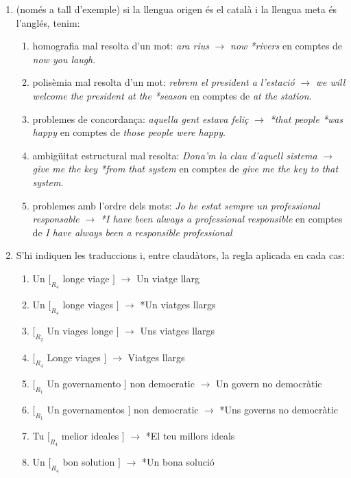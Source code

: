 \begin{enumerate}
\item (només a tall d'exemple) si la llengua origen és el català i la
  llengua meta és l'anglés, tenim:
  \begin{enumerate}
  \item homografia mal resolta d'un mot: \emph{ara rius} $\to$
    \emph{now *rivers} en comptes de \emph{now you laugh}.
  \item polisèmia mal resolta d'un mot: \emph{rebrem el president a
      l'estació} $\to$ \emph{we will welcome the president at the
      *season} en comptes de \emph{at the station}.
  \item problemes de concordança: \emph{aquella gent estava feliç}
    $\to$ \emph{*that people *was happy} en comptes de \emph{those
      people were happy}.
  \item ambigüitat estructural mal resolta: \emph{Dona'm la clau
      d'aquell sistema} $\to$ \emph{give me the key *from that system}
    en comptes de \emph{give me the key to that system}.
  \item problemes amb l'ordre dels mots: \emph{Jo he estat sempre un
      professional responsable} $\to$ \emph{*I have been always a
      professional responsible} en comptes de \emph{I have always been
      a responsible professional}
  \end{enumerate}

\item S'hi indiquen les traduccions i, entre claudàtors, la regla
  aplicada en cada cas:
  \begin{enumerate}
  \item \textsf{Un $[_{R_4}$ longe viage $]$} $\to$ Un viatge llarg
  \item \textsf{Un $[_{R_4}$ longe viages $]$} $\to$ *Un viatges
    llargs
  \item \textsf{$[_{R_2}$ Un viages longe $]$} $\to$ Uns viatges
    llargs
  \item \textsf{$[_{R_4}$ Longe viages $]$} $\to$ Viatges llargs
  \item \textsf{$[_{R_1}$ Un governamento $]$ non democratic} $\to$ Un
    govern no democràtic
  \item \textsf{$[_{R_1}$ Un governamentos $]$ non democratic} $\to$
    *Uns governs no democràtic
  \item \textsf{Tu $[_{R_4}$ melior ideales $]$} $\to$ *El teu millors
    ideals
  \item \textsf{Un $[_{R_4}$ bon solution $]$} $\to$ *Un bona solució
  \end{enumerate}



\end{enumerate}
